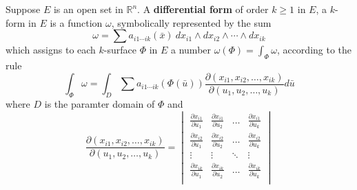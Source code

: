 \begin{definition}
	Suppose $E$ is an open set in $\mathbb{R}^n$.
	A \textbf{differential form} of order $k \ge 1$ in $E$, a $k$-form in $E$ is a function $\omega$,
	symbolically represented by the sum
	\begin{equation} \omega = \sum a_{i1 \dotsm ik}(\bar{x})\ dx_{i1}\wedge dx_{i2} \wedge \dotsm \wedge dx_{ik}
	\end{equation}
	which assigns to each $k$-surface $\Phi$ in $E$ a number $\omega(\Phi) = \int_{\Phi} \omega $,
	according to the rule
	\begin{equation}
		\int_{\Phi} \omega = \int_D \sum a_{i1 \dotsm ik}(\Phi(\bar{u})) \frac{\partial(x_{i1},x_{i2},\dots,x_{ik})}{\partial(u_1,u_2,\dots,u_k)}d\bar{u}
	\end{equation}
	where $D$ is the paramter domain of $\Phi$ and
	\begin{equation}
	\frac{\partial(x_{i1},x_{i2},\dots,x_{ik})}{\partial(u_1,u_2,\dots,u_k)} = \begin{vmatrix}
		\frac{\partial x_{i1}}{\partial u_1} & \frac{\partial x_{i1}}{\partial u_2} & \dots & \frac{\partial x_{i1}}{\partial u_k} \\
		\frac{\partial x_{i2}}{\partial u_1} & \frac{\partial x_{i2}}{\partial u_2} & \dots & \frac{\partial x_{i2}}{\partial u_k} \\
		\vdots & \vdots & \ddots & \vdots \\
		\frac{\partial x_{ik}}{\partial u_1} & \frac{\partial x_{ik}}{\partial u_2} & \dots & \frac{\partial x_{ik}}{\partial u_k} \\
	\end{vmatrix}
	\end{equation}
\end{definition}
